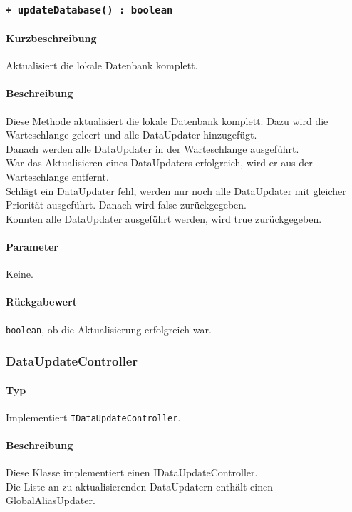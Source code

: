 \subsubsection*{\texttt{+ updateDatabase() : boolean}}%
\paragraph*{Kurzbeschreibung}
Aktualisiert die lokale Datenbank komplett.
\paragraph*{Beschreibung}
Diese Methode aktualisiert die lokale Datenbank komplett. 
Dazu wird die Warteschlange geleert und alle DataUpdater hinzugefügt.\\
Danach werden alle DataUpdater in der Warteschlange ausgeführt.\\
War das Aktualisieren eines DataUpdaters erfolgreich, wird er aus der Warteschlange entfernt.\\
Schlägt ein DataUpdater fehl, werden nur noch alle DataUpdater mit gleicher Priorität 
ausgeführt. Danach wird false zurückgegeben.\\
Konnten alle DataUpdater ausgeführt werden, wird true zurückgegeben.
\paragraph*{Parameter}
Keine.
\paragraph*{Rückgabewert}
\texttt{boolean}, ob die Aktualisierung erfolgreich war.

\subsubsection{DataUpdateController}
\paragraph*{Typ}
Implementiert \texttt{IDataUpdateController}.
\paragraph*{Beschreibung}
Diese Klasse implementiert einen IDataUpdateController.\\
Die Liste an zu aktualisierenden DataUpdatern enthält einen GlobalAliasUpdater.